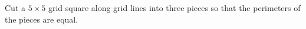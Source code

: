Cut a $5\times5$ grid square along grid lines into three pieces so that the perimeters of the pieces are equal.
